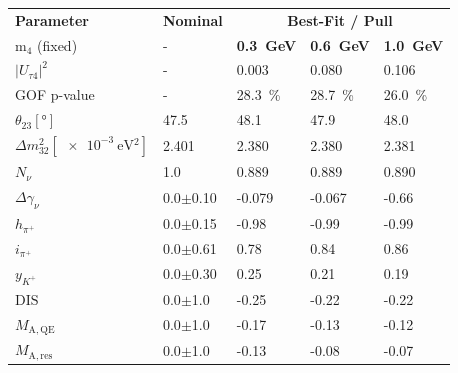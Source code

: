 \documentclass[
    aps,
    prd,
    reprint,
    amsmath,
    amssymb,
    nofootinbib,
    linenumbers,
    superscriptaddress,
    floatfix
]{revtex4-2}
\newcommand{\gev}{\giga\electronvolt}
\renewcommand{\rm}{\mathrm}
\newcommand{\rm}{\mathrm}
\begin{document}
\begin{table}[h]
    \begin{tabular}{ ll lll }
    \hline\hline
    \textbf{Parameter} & \textbf{Nominal} & \multicolumn{3}{c}{\textbf{Best-Fit / Pull}} \\ 
    m$_{4}$ (fixed) & - & \textbf{\SI{0.3}{\gev}} & \textbf{\SI{0.6}{\gev}} &  \textbf{\SI{1.0}{\gev}} \\ 
    \hline\hline
    $|U_{\tau 4}|^2$                                 & -                    & 0.003               & 0.080               & 0.106               \\
    GOF p-value                                      & -                    & \SI{28.3}{\percent} & \SI{28.7}{\percent} & \SI{26.0}{\percent} \\
    \hline
    $\theta_{23} [\si{\degree}]$                     &    47.5              &          48.1       &          47.9       &          48.0       \\ 
    $\Delta m^{2}_{32} [\SI{e-3}{\electronvolt^2}] $ &    2.401             &              2.380  &              2.380  &              2.381  \\ 
    \hline
    $N_{\nu}$                                        &    1.0               &           0.889     &           0.889     &           0.890     \\ 
    $\Delta \gamma_\nu$                              &    0.0$\pm$0.10      &          -0.079     &          -0.067     &          -0.66      \\ 
    $h_{\pi^+}$                                      &    0.0$\pm$0.15      &          -0.98      &          -0.99      &          -0.99      \\ 
    $i_{\pi^+}$                                      &    0.0$\pm$0.61      &           0.78      &           0.84      &           0.86      \\ 
    $y_{K^+}$                                        &    0.0$\pm$0.30      &           0.25      &           0.21      &           0.19      \\ 
    \hline
    $\rm{DIS}$                                       &    0.0$\pm$1.0       &          -0.25      &          -0.22      &          -0.22      \\ 
    $M_\rm{A,QE}$                                    &    0.0$\pm$1.0       &          -0.17      &          -0.13      &          -0.12      \\ 
    $M_\rm{A,res}$                                   &    0.0$\pm$1.0       &          -0.13      &          -0.08      &          -0.07      \\ 

\end{tabular}
\end{table}
\end{document}
